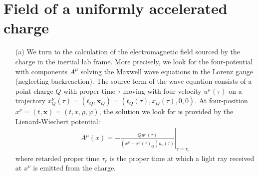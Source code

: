 \documentclass[10pt, a4paper]{article}
\begin{document}
\begin{enumerate}
\end{enumerate}

\section{Field of a uniformly accelerated charge}
\begin{enumerate}
  \item[(a)] We turn to the calculation of the electromagnetic field sourced by the charge in the inertial lab frame. More precisely, we look for the four-potential with components $A^{\mu}$ solving the Maxwell wave equations in the Lorenz gauge (neglecting backreaction). The source term of the wave equation consists of a point charge $Q$ with proper time $\tau$ moving with four-velocity $u^{\mu}(\tau)$ on a trajectory $x^{\nu}_Q(\tau) = (t_Q, \mathbf{x}_Q)=  (t_Q(\tau), x_Q(\tau), 0, 0)$. At four-position $x^\nu = (t, \mathbf{x}) = (t, x, \rho, \varphi)$, the solution we look for is provided by the Lienard-Wiechert potential:
  \begin{align*}
    A^\mu(x)=-\left.\frac{Q u^\mu(\tau)}{\left(x^\nu-x^\nu(\tau)_Q\right) u_\nu(\tau)}\right|_{\tau=\tau_r}
 \end{align*}
 where retarded proper time $\tau_r$ is the proper time at which a light ray received at $x^{\nu}$ is emitted from the charge. 
 

\end{enumerate}
\end{document}
